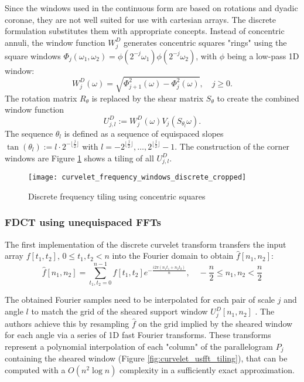 Since the windows used in the continuous form are based on rotations and dyadic
coronae, they are not well suited for use with cartesian arrays. The discrete
formulation substitutes them with appropriate concepts. Instead of concentric
annuli, the window function $W^D_j$ generates concentric squares "rings" using
the square windows $\Phi_j(\omega_1, \omega_2) = \phi(2^{-j}\omega_1)
\phi(2^{-j}\omega_2)$, with $\phi$ being a low-pass 1D window:
\begin{equation*}
    W_j^D(\omega) = \sqrt{\Phi_{j+1}^2(\omega) - \Phi_j^2(\omega)}, \quad j \geq 0.
\end{equation*}
The rotation matrix $R_{\theta}$ is replaced by the shear matrix $S_{\theta}$
to create the combined window function
\begin{equation*}
    U_{j, l}^D := W_j^D(\omega) V_j(S_{\theta_l}\omega).
\end{equation*}
The sequence $\theta_l$ is defined as a sequence of equispaced slopes
$\tan(\theta_l) := l \cdot 2^{- \lfloor \frac{j}{2} \rfloor}$ with
$l=-2^{\lfloor \frac{j}{2} \rfloor}, \dots, 2^{\lfloor \frac{j}{2} \rfloor} -
1$. The construction of the corner windows are  Figure \ref{fig:curvelet_frequency_windows_discrete} shows a tiling of
all $U_{j, l}^D$.

\begin{figure}[h]
    \centering
        \texttt{[image: curvelet\_frequency\_windows\_discrete\_cropped]}
    \caption{Discrete frequency tiling using concentric squares}
    \label{fig:curvelet_frequency_windows_discrete}
\end{figure}

\subsubsection{FDCT using unequispaced FFTs}

The first implementation of the discrete curvelet transform transfers the input
array $f[t_1, t_2]$, $0 \leq t_1, t_2 < n$ into the Fourier domain to obtain
$\hat{f}[n_1, n_2]$:
\begin{equation*}
    \hat{f}[n_1, n_2] = \sum_{t_1, t_2 = 0}^{n - 1} f[t_1, t_2] e^{- \frac{i 2 \pi (n_1 t_1 + n_2 t_2)}{n}}, \quad -\frac{n}{2} \leq n_1, n_2 < \frac{n}{2}
\end{equation*}

The obtained Fourier samples need to be interpolated for each pair of scale $j$
and angle $l$ to match the grid of the sheared support window $U_j^D[n_1, n_2]$
. The authors achieve this by resampling $\hat{f}$ on the grid
implied by the sheared window for each angle via a series of 1D fast Fourier
transforms.  These transforms represent a polynomial interpolation of each
"column" of the parallelogram $P_j$ containing the sheared window (Figure
\ref{fig:curvelet_usfft_tiling}), that can be computed with a $O(n^2 \log n)$
complexity in a sufficiently exact approximation.

